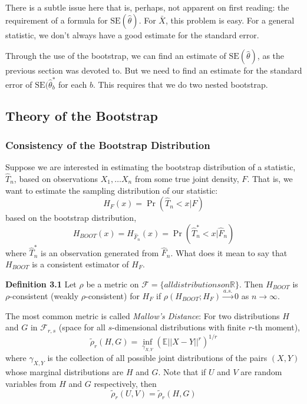 \documentclass[12pt]{article}
\newcommand{\R}{\mathbb{R}}
\newcommand{\E}{\mathbb{E}}
\newcommand{\SE}{\text{SE}}
\numberwithin{equation}{section}
\begin{document}
There is a subtle issue here that is, perhaps, not apparent on first reading: the requirement of a formula for $\SE(\hat{\theta})$. For $\bar{X}$, this problem is easy. For a general statistic, we don't always have a good estimate for the standard error. 

Through the use of the bootstrap, we can find an estimate of $\SE(\hat{\theta})$, as the previous section was devoted to. But we need to find an estimate for the standard error of $\SE(\hat{\theta}_b^*$ for each $b$. This requires that we do two nested bootstrap. 


\subsection{Theory of the Bootstrap}
\subsubsection{Consistency of the Bootstrap Distribution}
Suppose we are interested in estimating the bootstrap distribution of a statistic, $\hat{T}_n$, based on observations $X_1, \ldots X_n$ from some true joint density, $F$. That is, we want to estimate the sampling distribution of our statistic:
\begin{equation*}
  H_F(x) = \Pr(\hat{T}_n < x | F)
\end{equation*}
%
based on the bootstrap distribution,
\begin{equation*}
  H_{BOOT}(x) = H_{\hat{F}_n}(x)
    = \Pr(\hat{T}^*_n < x | \hat{F}_n)
\end{equation*}
%
where $\hat{T}_n^*$ is an observation generated from $\hat{F}_n$. What does it mean to say that $H_{BOOT}$ is a consistent estimator of $H_F$. 

\textbf{Definition 3.1}
Let $\rho$ be a metric on $\mathcal{F} = \{all distributions on \R\}$. Then $H_{BOOT}$ is
$\rho$-consistent (weakly $\rho$-consistent) for $H_F$ if $\rho(H_{BOOT}; H_F) \overset{a.s.}{\to} 0$ as $n \to \infty$.

The most common metric is called \textit{Mallow's Distance}: For two distributions $H$ and $G$ in $\mathcal{F}_{r, s}$ (space for all
$s$-dimensional distributions with finite $r$-th moment),
\begin{equation*}
  \tilde{\rho}_r(H, G) = \inf_{\gamma_{X, Y}} \left(
    \E ||X - Y||^r
  \right) ^ {1 / r}
\end{equation*}
where $\gamma_{X, Y}$ is the collection of all possible joint distributions of the pairs $(X, Y)$ whose marginal distributions are $H$ and $G$. Note that if $U$ and $V$ are random variables from $H$ and $G$ respectively, then
\begin{equation*}
  \tilde{\rho}_r(U, V) = \tilde{\rho}_r(H, G)
\end{equation*}
\end{document}
